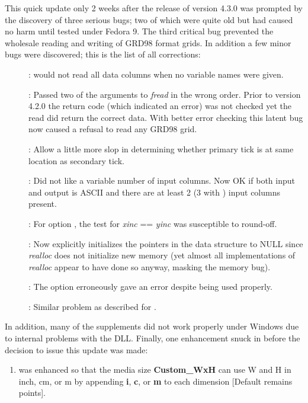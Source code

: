 This quick update only 2 weeks after the release of version 4.3.0 was prompted by the discovery of three
serious bugs; two of which were quite old but had caused no harm until tested under Fedora 9.
The third critical bug prevented the wholesale reading and writing of GRD98 format grids.  In addition
a few minor bugs were discovered; this is the list of all corrections:
\begin{description}
\item []:  would not read all data columns when no variable names were given.
\item []: Passed two of the arguments to {\it fread} in the wrong order. Prior to version 4.2.0
the return code (which indicated an error) was not checked yet the read did return the correct data.
With better error checking this latent bug now caused a refusal to read any GRD98 grid.
\item []: Allow a little more slop in determining whether primary tick
is at same location as secondary tick.
\item []: Did not like a variable number of input columns.  Now OK if both input and output is ASCII
and there are at least 2 (3 with ) input columns present.
\item []: For option , the test for {\it xinc} == {\it yinc} was susceptible to round-off.
\item []: Now explicitly initializes the pointers in the data structure to NULL since {\it realloc} does not
initialize new memory (yet almost all implementations of {\it realloc} appear to have done so anyway, masking the memory bug).
\item []: The  option erroneously gave an error despite being used properly.
\item []: Similar problem as described for .
\end{description}

In addition, many of the supplements did not work properly under Windows due to internal problems with the DLL.  Finally,
one enhancement snuck in before the decision to issue this update was made:
\begin{enumerate}
\item {} was enhanced so that the media size {\bf Custom\_WxH} can use W and H in inch, cm, or m
by appending {\bf i}, {\bf c}, or {\bf m} to each dimension [Default remains points].
\end{enumerate}


